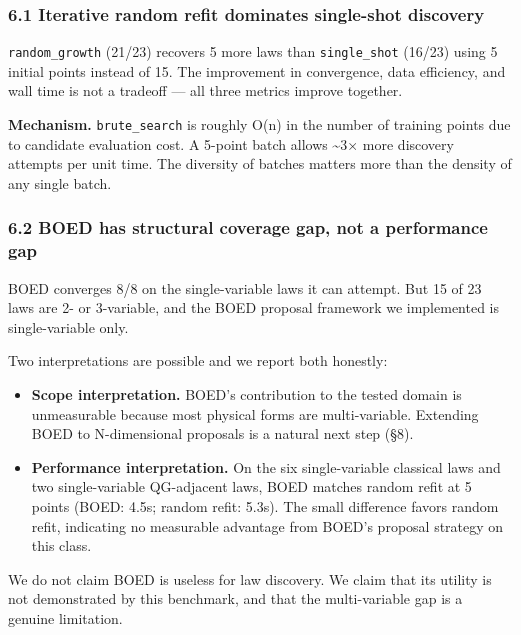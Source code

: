 \documentclass[
]{article}
\providecommand{\tightlist}{%
  \setlength{\itemsep}{0pt}\setlength{\parskip}{0pt}}
\begin{document}
\subsubsection{6.1 Iterative random refit dominates single-shot
discovery}\label{iterative-random-refit-dominates-single-shot-discovery}

\texttt{random\_growth} (21/23) recovers 5 more laws than
\texttt{single\_shot} (16/23) using 5 initial points instead of 15. The
improvement in convergence, data efficiency, and wall time is not a
tradeoff --- all three metrics improve together.

\textbf{Mechanism.} \texttt{brute\_search} is roughly O(n) in the number
of training points due to candidate evaluation cost. A 5-point batch
allows \textasciitilde3× more discovery attempts per unit time. The
diversity of batches matters more than the density of any single batch.

\subsubsection{6.2 BOED has structural coverage gap, not a performance
gap}\label{boed-has-structural-coverage-gap-not-a-performance-gap}

BOED converges 8/8 on the single-variable laws it can attempt. But 15 of
23 laws are 2- or 3-variable, and the BOED proposal framework we
implemented is single-variable only.

Two interpretations are possible and we report both honestly:

\begin{itemize}
\tightlist
\item
  \textbf{Scope interpretation.} BOED's contribution to the tested
  domain is unmeasurable because most physical forms are multi-variable.
  Extending BOED to N-dimensional proposals is a natural next step (§8).
\item
  \textbf{Performance interpretation.} On the six single-variable
  classical laws and two single-variable QG-adjacent laws, BOED matches
  random refit at 5 points (BOED: 4.5s; random refit: 5.3s). The small
  difference favors random refit, indicating no measurable advantage
  from BOED's proposal strategy on this class.
\end{itemize}

We do not claim BOED is useless for law discovery. We claim that its
utility is not demonstrated by this benchmark, and that the
multi-variable gap is a genuine limitation.
\end{document}
